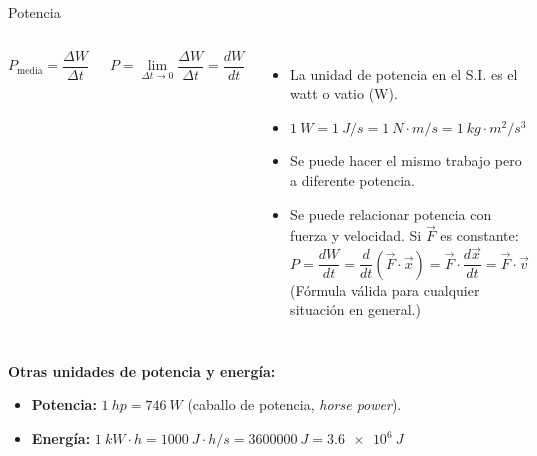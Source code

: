 \documentclass[9pt, aspectratio=169]{beamer}
\begin{document}
\begin{frame}{Potencia}
\begin{columns}
\begin{definition}
    \[ P_{\text{media}} = \frac{\Delta W}{\Delta t} \]
\end{definition}
\pause 
\bigskip

\begin{definition}
    \[ P = \lim_{\Delta t \rightarrow 0} \frac{\Delta W}{\Delta t} = \frac{dW}{dt} \]
\end{definition}
\pause
\begin{itemize}
    \item La unidad de potencia en el S.I. es el watt o vatio (\unit{W}).
    \item $\qty{1}{W} = \qty{1}{J/s} = \qty{1}{N \cdot m / s} = \qty{1}{kg \cdot m^2 / s^3} $
    \item Se puede hacer el mismo trabajo pero a diferente potencia.
    \item Se puede relacionar potencia con fuerza y velocidad. Si $\vec{F}$ es constante:
        \[ P = \frac{dW}{dt} = \frac{d}{dt}(\vec{F} \cdot \vec{x}) = \vec{F} \cdot \frac{d \vec{x}}{dt} = \vec{F} \cdot \vec{v} \]
        (Fórmula válida para cualquier situación en general.)
\end{itemize}
\end{columns}
\pause

\textbf{Otras unidades de potencia y energía:}
\begin{itemize}
    \item \textbf{Potencia:} $\qty{1}{hp} = \qty{746}{W}$ (caballo de potencia, \textit{horse power}).
    \item \textbf{Energía:} $\qty{1}{kW \cdot h} = \qty{1000}{J \cdot h / s} = \qty{3600000}{J} = \qty{3.6e6}{J}$
\end{itemize}
\end{frame}
\end{document}

